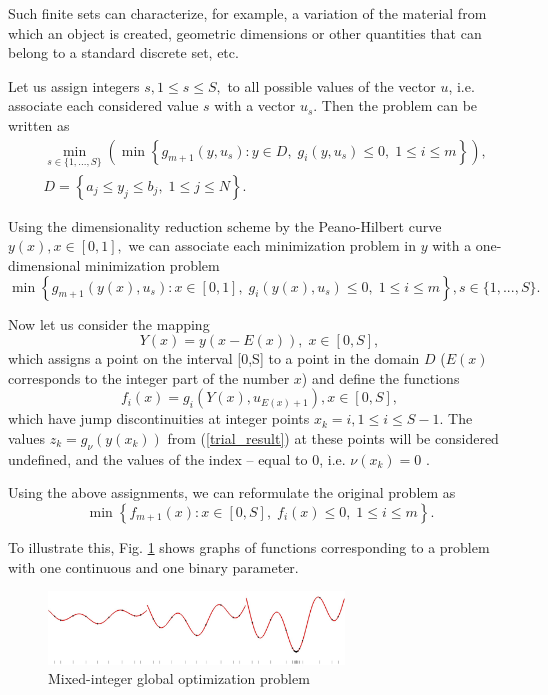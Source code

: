\documentclass[
11pt,%
tightenlines,%
twoside,%
onecolumn,%
nofloats,%
nobibnotes,%
nofootinbib,%
superscriptaddress,%
noshowpacs,%
centertags]%
{revtex4}
\begin{document}
Such finite sets can characterize, for example, a variation of the material from which an object is created, geometric dimensions or other quantities that can belong to a standard discrete set, etc.


Let us assign integers  $s, 1\leq s \leq S,$ to all possible values of the vector $u$, i.e. associate each considered value $s$ with a vector $u_s$. 
Then the problem can be written as
\begin{eqnarray}\label{problem_is}
& \min_{s\in\{1,...,S\}}\left(\min{\left\{ g_{m+1}(y,u_s):y\in D, \; g_i(y,u_s)\leq 0, \; 1 \leq i \leq m\right\}}\right),\\
& D=\left\{ a_j\leq y_j \leq b_j, \; 1 \leq j\leq N \right\}.\nonumber 
\end{eqnarray}

Using the dimensionality reduction scheme by the Peano-Hilbert curve $y(x), x\in [0,1],$ we can associate each minimization problem in $y$ with a one-dimensional minimization problem
\[
 \min{\left\{ g_{m+1}(y(x),u_s):x \in [0,1], \; g_i(y(x),u_s)\leq 0, \; 1 \leq i \leq m\right\}}, s\in\{1,...,S\}.
\]

Now let us consider the mapping
\[
Y(x)=y(x-E(x)), \; x\in[0,S],
\]
which assigns a point on the interval  [0,S] to a point in the domain $D$ ($E(x)$ corresponds to the integer part of the number $x$) and define the functions 
\[
f_i(x) = g_i(Y(x),u_{E(x)+1}), x\in[0,S],
\]
which have jump discontinuities at integer points $x_k = i, 1\leq i \leq S-1$.
The values $z_k = g_\nu(y(x_k))$ from (\ref{trial_result}) at these points will be considered undefined, and the values of the index -- equal to 0, i.e. $\nu(x_k) = 0$ .

Using the above assignments, we can reformulate the original problem as
\begin{equation}\label{problem_is1}
\min \left\{f_{m+1}(x): x \in [0,S], \; f_i(x) \leq 0, \; 1 \leq i \leq m\right\}.
\end{equation}

To illustrate this, Fig. \ref{fig:1} shows graphs of functions corresponding to a problem with one continuous and one binary parameter.
\begin{figure}[ht]
    \centering
    \includegraphics[width=0.7\textwidth]{fig1.jpg}
    \caption{Mixed-integer global optimization problem}
    \label{fig:1}
\end{figure}
\end{document}
